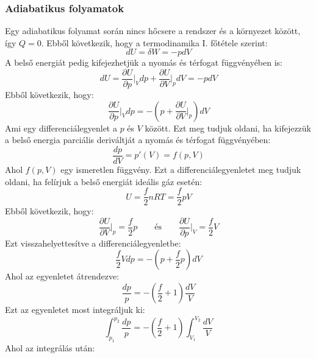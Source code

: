 \documentclass[a4paper,12pt]{article}
\begin{document}
\subsubsection{Adiabatikus folyamatok}
Egy adiabatikus folyamat során nincs hőcsere a rendszer és a környezet között, így $Q = 0$. Ebből következik, hogy a termodinamika I. főtétele szerint:
\begin{equation}
    dU = \delta W = - p dV
\end{equation}
A belső energiát pedig kifejezhetjük a nyomás és térfogat függvényében is:
\begin{equation}
    dU = \frac{\partial U}{\partial p}\bigg|_{V} dp + \frac{\partial U}{\partial V}\bigg|_{p} dV = - p dV
\end{equation}
Ebből következik, hogy:
\begin{equation}
   \frac{\partial U}{\partial p}\bigg|_{V} dp = - \left(p + \frac{\partial U}{\partial V}\bigg|_{p}\right) dV
\end{equation}
Ami egy differenciálegyenlet a $p$ és $V$ között. Ezt meg tudjuk oldani, ha kifejezzük a belső energia parciális deriváltját a nyomás és térfogat függvényében:
\begin{equation}
    \frac{dp}{dV} = p'(V) = f(p, V)
\end{equation}
Ahol $f(p, V)$ egy ismeretlen függvény. Ezt a differenciálegyenletet meg tudjuk oldani, ha felírjuk a belső energiát ideális gáz esetén:
\begin{equation}
    U = \frac{f}{2} n R T = \frac{f}{2} p V
\end{equation}
Ebből következik, hogy:
\begin{equation}
    \frac{\partial U}{\partial V}\bigg|_{p} = \frac{f}{2} p \qquad \text{és} \qquad \frac{\partial U}{\partial p}\bigg|_{V} = \frac{f}{2} V
\end{equation}
Ezt visszahelyettesítve a differenciálegyenletbe:
\begin{equation}
    \frac{f}{2} V dp = - \left(p + \frac{f}{2} p\right) dV
\end{equation}
Ahol az egyenletet átrendezve:
\begin{equation}
    \frac{dp}{p} = - \left(\frac{f}{2} + 1\right) \frac{dV}{V}
\end{equation}
Ezt az egyenletet most integráljuk ki:
\begin{equation}
    \int_{p_1}^{p_2} \frac{dp}{p} = - \left(\frac{f}{2} + 1\right) \int_{V_1}^{V_2} \frac{dV}{V}
\end{equation}
Ahol az integrálás után:
\end{document}
